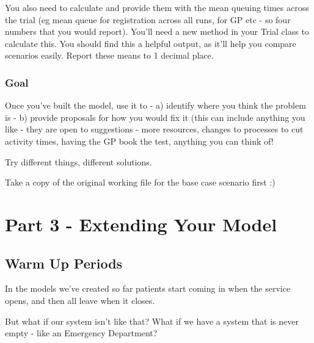 \documentclass[
  letterpaper,
  DIV=11,
  numbers=noendperiod]{scrreprt}
\begin{document}
You also need to calculate and provide them with the mean queuing times
across the trial (eg mean queue for registration across all runs, for GP
etc - so four numbers that you would report). You'll need a new method
in your Trial class to calculate this. You should find this a helpful
output, as it'll help you compare scenarios easily. Report these means
to 1 decimal place.

\section{Goal}\label{goal}

Once you've built the model, use it to - a) identify where you think the
problem is - b) provide proposals for how you would fix it (this can
include anything you like - they are open to suggestions - more
resources, changes to processes to cut activity times, having the GP
book the test, anything you can think of!

Try different things, different solutions.

\begin{tcolorbox}[enhanced jigsaw, rightrule=.15mm, colback=white, colframe=quarto-callout-tip-color-frame, colbacktitle=quarto-callout-tip-color!10!white, toprule=.15mm, coltitle=black, opacityback=0, titlerule=0mm, bottomtitle=1mm, breakable, title=\textcolor{quarto-callout-tip-color}{\faLightbulb}\hspace{0.5em}{Tip}, opacitybacktitle=0.6, toptitle=1mm, arc=.35mm, bottomrule=.15mm, leftrule=.75mm, left=2mm]

Take a copy of the original working file for the base case scenario
first :)

\end{tcolorbox}

\part{Part 3 - Extending Your Model}

\chapter{Warm Up Periods}\label{sec-warmup}

In the models we've created so far patients start coming in when the
service opens, and then all leave when it closes.

But what if our system isn't like that? What if we have a system that is
never empty - like an Emergency Department?
\end{document}
